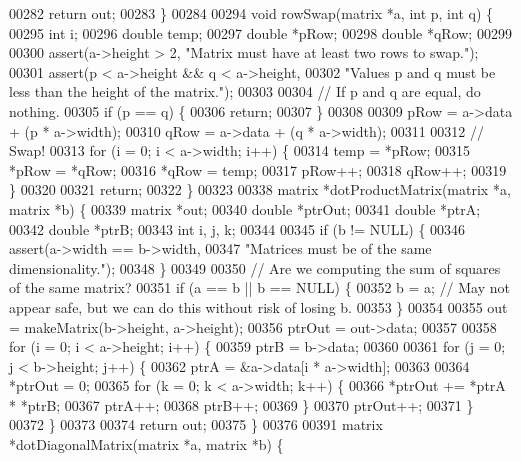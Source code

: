 \begin{DoxyCode}
{{00282   \textcolor{keywordflow}{return} out;
00283 \}
00284 
00294 \textcolor{keywordtype}{void} rowSwap(matrix *a, \textcolor{keywordtype}{int} p, \textcolor{keywordtype}{int} q) \{
00295   \textcolor{keywordtype}{int} i;
00296   \textcolor{keywordtype}{double} temp;
00297   \textcolor{keywordtype}{double} *pRow;
00298   \textcolor{keywordtype}{double} *qRow;
00299 
00300   assert(a->height > 2, \textcolor{stringliteral}{"Matrix must have at least two rows to swap."});
00301   assert(p < a->height && q < a->height,
00302          \textcolor{stringliteral}{"Values p and q must be less than the height of the matrix."});
00303 
00304   \textcolor{comment}{// If p and q are equal, do nothing.}
00305   \textcolor{keywordflow}{if} (p == q) \{
00306     \textcolor{keywordflow}{return};
00307   \}
00308 
00309   pRow = a->data + (p * a->width);
00310   qRow = a->data + (q * a->width);
00311 
00312   \textcolor{comment}{// Swap!}
00313   \textcolor{keywordflow}{for} (i = 0; i < a->width; i++) \{
00314     temp = *pRow;
00315     *pRow = *qRow;
00316     *qRow = temp;
00317     pRow++;
00318     qRow++;
00319   \}
00320 
00321   \textcolor{keywordflow}{return};
00322 \}
00323 
00338 matrix *dotProductMatrix(matrix *a, matrix *b) \{
00339   matrix *out;
00340   \textcolor{keywordtype}{double} *ptrOut;
00341   \textcolor{keywordtype}{double} *ptrA;
00342   \textcolor{keywordtype}{double} *ptrB;
00343   \textcolor{keywordtype}{int} i, j, k;
00344 
00345   \textcolor{keywordflow}{if} (b != NULL) \{
00346     assert(a->width == b->width,
00347            \textcolor{stringliteral}{"Matrices must be of the same dimensionality."});
00348   \}
00349 
00350   \textcolor{comment}{// Are we computing the sum of squares of the same matrix?}
00351   \textcolor{keywordflow}{if} (a == b || b == NULL) \{
00352     b = a; \textcolor{comment}{// May not appear safe, but we can do this without risk of losing b.}
00353   \}
00354 
00355   out = makeMatrix(b->height, a->height);
00356   ptrOut = out->data;
00357 
00358   \textcolor{keywordflow}{for} (i = 0; i < a->height; i++) \{
00359     ptrB = b->data;
00360 
00361     \textcolor{keywordflow}{for} (j = 0; j < b->height; j++) \{
00362       ptrA = &a->data[i * a->width];
00363 
00364       *ptrOut = 0;
00365       \textcolor{keywordflow}{for} (k = 0; k < a->width; k++) \{
00366         *ptrOut += *ptrA * *ptrB;
00367         ptrA++;
00368         ptrB++;
00369       \}
00370       ptrOut++;
00371     \}
00372   \}
00373 
00374   \textcolor{keywordflow}{return} out;
00375 \}
00376 
00391 matrix *dotDiagonalMatrix(matrix *a, matrix *b) \{
}}
\end{DoxyCode}
